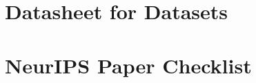 \documentclass[10pt]{article}
\begin{document}
\section{Datasheet for Datasets}
\label{app:datasheet}



\newpage
\section*{NeurIPS Paper Checklist}
\end{document}
